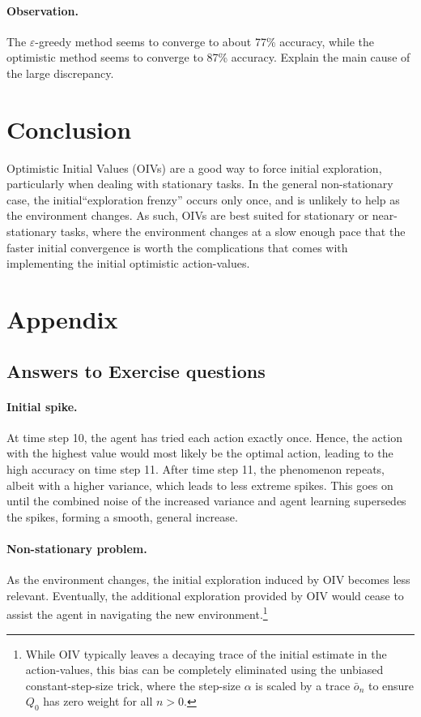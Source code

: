 \documentclass{article}
\begin{document}
\paragraph{Observation.} The $\varepsilon$-greedy method seems to converge to about 77\% accuracy, while the optimistic method seems to converge to 87\% accuracy. Explain the main cause of the large discrepancy.

\section{Conclusion}
Optimistic Initial Values (OIVs) are a good way to force initial exploration, particularly when dealing with stationary tasks. In the general non-stationary case, the initial``exploration frenzy'' occurs only once, and is unlikely to help as the environment changes. As such, OIVs are best suited for stationary or near-stationary tasks, where the environment changes at a slow enough pace that the faster initial convergence is worth the complications that comes with implementing the initial optimistic action-values.

\section{Appendix}
\subsection{Answers to Exercise questions}
\paragraph{Initial spike.} At time step 10, the agent has tried each action exactly once. Hence, the action with the highest value would most likely be the optimal action, leading to the high accuracy on time step 11. After time step 11, the phenomenon repeats, albeit with a higher variance, which leads to less extreme spikes. This goes on until the combined noise of the increased variance and agent learning supersedes the spikes, forming a smooth, general increase.
\paragraph{Non-stationary problem.} As the environment changes, the initial exploration induced by OIV becomes less relevant. Eventually, the additional exploration provided by OIV would cease to assist the agent in navigating the new environment.\footnote{While OIV typically leaves a decaying trace of the initial estimate in the action-values, this bias can be completely eliminated using the unbiased constant-step-size trick, where the step-size $\alpha$ is scaled by a trace $\bar{o}_n$ to ensure $Q_0$ has zero weight for all $n > 0$.}
\end{document}
